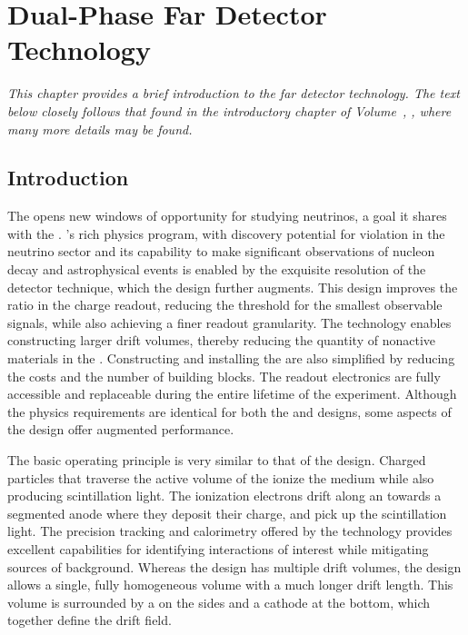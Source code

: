 \chapter{Dual-Phase Far Detector Technology}
\label{ch:exec-dp}

\textit{This chapter provides a brief introduction to the  far detector technology.  The text below closely follows that found in the introductory chapter of Volume~\volnumberdp{}, \voltitledp{}, where many more details may be found.}

\section{Introduction}
\label{sec:dp-execsum-introduction}


The    opens new windows of opportunity for studying neutrinos, a goal it shares with the  .   's rich physics program, with discovery potential for  violation in the neutrino sector and its capability to make significant observations of nucleon decay and astrophysical events is enabled by the exquisite resolution of the  detector technique, which the  design further augments. This design improves the  ratio in the charge readout, reducing the threshold for the smallest observable signals, while also achieving a finer readout granularity.  The  technology enables constructing larger drift volumes, thereby reducing  the quantity of nonactive materials in the . Constructing and installing the  are also simplified by reducing the costs and the number of  building blocks. The readout electronics are fully accessible and replaceable during the entire lifetime of the experiment. Although the physics requirements are identical for both the  and  designs, some aspects of the  design offer augmented performance. 


The basic operating principle is very similar to that of the  design.  Charged particles that traverse the active volume of the  ionize the medium while also producing scintillation light. The ionization electrons drift along an \efield towards a segmented anode where they deposit their charge, and  pick up the scintillation light. The precision tracking and calorimetry offered by the  technology provides excellent capabilities for identifying interactions of interest while mitigating sources of background.  Whereas the  design has multiple drift volumes, the  design allows a single, fully homogeneous  volume with a much longer drift length. This volume is surrounded by a  on the sides and a cathode at the bottom, which together define the drift field. 

